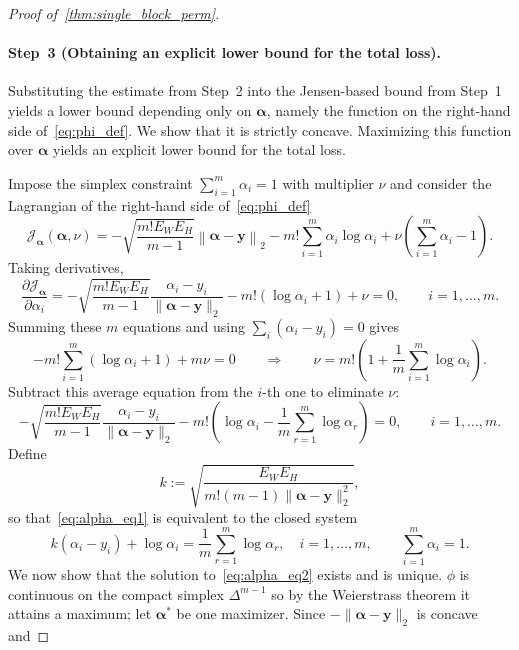 \documentclass[11pt]{article}
\begin{document}
\begin{proof}[Proof of~\cref{thm:single_block_perm}]
\paragraph{Step~3 (Obtaining an explicit lower bound for the total loss).}
Substituting the estimate from Step~2 into the Jensen-based bound from Step~1 yields a lower bound depending only on $\boldsymbol{\alpha}$, namely the function on the right-hand side of~\cref{eq:phi_def}. We show that it is strictly concave. Maximizing this function over $\boldsymbol{\alpha}$ yields an explicit lower bound for the total loss.

Impose the simplex constraint $\sum_{i=1}^m\alpha_i=1$ with multiplier $\nu$ and
consider the Lagrangian of the right-hand side of~\cref{eq:phi_def}
\[
  \mathscr{J}_{\boldsymbol{\alpha}}(\boldsymbol{\alpha},\nu)
  =-\sqrt{\frac{m! E_W E_H}{ m-1 }} 
     \left\|\boldsymbol{\alpha}-\boldsymbol{y}\right\|_2
   - m!\sum_{i=1}^m\alpha_i\log\alpha_i
   + \nu\left(\sum_{i=1}^m\alpha_i-1\right).
\]
Taking derivatives,
\[
  \frac{\partial\mathscr{J}_{\boldsymbol{\alpha}}}{\partial\alpha_i}
  =-\sqrt{\frac{m! E_W E_H}{ m-1 }}
    \frac{\alpha_i-y_i}{\|\boldsymbol{\alpha}-\boldsymbol{y}\|_2}
   - m!\left(\log\alpha_i+1\right)
   + \nu
   = 0,
  \qquad i=1,\dots,m.
\]
Summing these $m$ equations and using $\sum_i(\alpha_i-y_i)=0$ gives
\[
  - m!\sum_{i=1}^m(\log\alpha_i+1)+m \nu=0 \qquad
   \Longrightarrow \qquad
  \nu=m!\left(1+\frac1m\sum_{i=1}^m\log\alpha_i\right).
\]
Subtract this average equation from the $i$-th one to eliminate $\nu$:
\begin{equation}
  -\sqrt{\frac{m! E_W E_H}{ m-1 }}
    \frac{\alpha_i-y_i}{\|\boldsymbol{\alpha}-\boldsymbol{y}\|_2}
   - m!\left(\log\alpha_i-\frac1m\sum_{r=1}^m\log\alpha_r\right)=0,
  \qquad i=1,\dots,m.
  \label{eq:alpha_eq1}
\end{equation}
Define
\[
  k:= \sqrt{\frac{E_W E_H}{ m!(m-1) \|\boldsymbol{\alpha}-\boldsymbol{y}\|_2^2}},
\]
so that~\cref{eq:alpha_eq1} is equivalent to the closed system
\begin{equation}
  \label{eq:alpha_eq2}
    k (\alpha_i-y_i) + \log\alpha_i
    = \frac1m\sum_{r=1}^m\log\alpha_r,
    \quad i=1,\dots,m,
    \qquad
    \sum_{i=1}^m\alpha_i=1.
  \end{equation}
We now show that the solution to~\cref{eq:alpha_eq2} exists and is unique. $\phi$ is continuous on the compact simplex
$
  \Delta^{m-1}
$
so by the Weierstrass theorem it attains a maximum; let
$\boldsymbol{\alpha}^*$ be one maximizer. Since $-\|\boldsymbol{\alpha}-\boldsymbol{y}\|_2$ is concave and

\end{proof}
\end{document}
